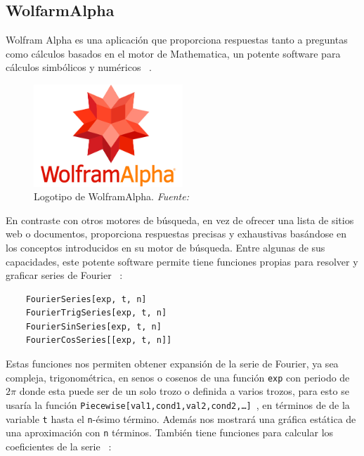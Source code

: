 \subsection{WolfarmAlpha}
Wolfram Alpha es una aplicación que proporciona respuestas tanto a preguntas como cálculos basados en el motor de Mathematica, un potente software para cálculos simbólicos y numéricos ~\cite{wolframMatemathica}. 
\begin{figure}[H]
	\centering
	\includegraphics[width=0.5\textwidth]{img/chapter02/logo_wolfram.jpg}
	\caption[Logotipo de WolframAlpha.]{Logotipo de WolframAlpha. \textit{Fuente: ~\cite{wolframMatemathica}}}
	\label{fig:logo-wolfram}  %
\end{figure}
En contraste con otros motores de búsqueda, en vez de ofrecer una lista de sitios web o documentos, proporciona respuestas precisas y exhaustivas basándose en los conceptos introducidos en su motor de búsqueda. Entre algunas de sus capacidades, este potente software permite tiene funciones propias para resolver y graficar series de Fourier ~\cite{wolfram2024}:
\begin{verbatim}
	FourierSeries[exp, t, n]
	FourierTrigSeries[exp, t, n]
	FourierSinSeries[exp, t, n]
	FourierCosSeries[[exp, t, n]]
\end{verbatim} 
Estas funciones nos permiten obtener expansión de la serie de Fourier, ya sea compleja, trigonométrica, en senos o cosenos  de una función \texttt{exp} con periodo de $2\pi$ donde esta puede ser de un solo trozo o definida a varios trozos, para esto se usaría la función \texttt{Piecewise[{{val1,cond1},{val2,cond2},…}]}~\cite{wolframMatemathicaPiecewise}, en términos de de la variable \texttt{t} hasta el \texttt{n}-ésimo término. Además nos mostrará una gráfica estática de una aproximación con \texttt{n} términos. También tiene funciones para calcular los coeficientes de la serie ~\cite{wolframMatemathica}:
